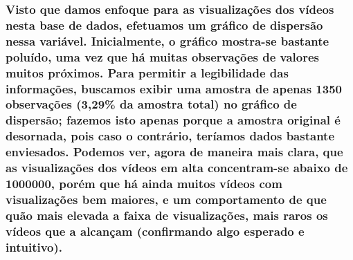 \documentclass[]{article}
\begin{document}
\hypertarget{visto-que-damos-enfoque-para-as-visualizacoes-dos-videos-nesta-base-de-dados-efetuamos-um-grafico-de-dispersao-nessa-variavel.-inicialmente-o-grafico-mostra-se-bastante-poluido-uma-vez-que-ha-muitas-observacoes-de-valores-muitos-proximos.-para-permitir-a-legibilidade-das-informacoes-buscamos-exibir-uma-amostra-de-apenas-1350-observacoes-329-da-amostra-total-no-grafico-de-dispersao-fazemos-isto-apenas-porque-a-amostra-original-e-desornada-pois-caso-o-contrario-teriamos-dados-bastante-enviesados.-podemos-ver-agora-de-maneira-mais-clara-que-as-visualizacoes-dos-videos-em-alta-concentram-se-abaixo-de-1000000-porem-que-ha-ainda-muitos-videos-com-visualizacoes-bem-maiores-e-um-comportamento-de-que-quao-mais-elevada-a-faixa-de-visualizacoes-mais-raros-os-videos-que-a-alcancam-confirmando-algo-esperado-e-intuitivo.}{%
\subsubsection{Visto que damos enfoque para as visualizações dos vídeos
nesta base de dados, efetuamos um gráfico de dispersão nessa variável.
Inicialmente, o gráfico mostra-se bastante poluído, uma vez que há
muitas observações de valores muitos próximos. Para permitir a
legibilidade das informações, buscamos exibir uma amostra de apenas 1350
observações (3,29\% da amostra total) no gráfico de dispersão; fazemos
isto apenas porque a amostra original é desornada, pois caso o
contrário, teríamos dados bastante enviesados. Podemos ver, agora de
maneira mais clara, que as visualizações dos vídeos em alta
concentram-se abaixo de 1000000, porém que há ainda muitos vídeos com
visualizações bem maiores, e um comportamento de que quão mais elevada a
faixa de visualizações, mais raros os vídeos que a alcançam (confirmando
algo esperado e
intuitivo).}\label{visto-que-damos-enfoque-para-as-visualizacoes-dos-videos-nesta-base-de-dados-efetuamos-um-grafico-de-dispersao-nessa-variavel.-inicialmente-o-grafico-mostra-se-bastante-poluido-uma-vez-que-ha-muitas-observacoes-de-valores-muitos-proximos.-para-permitir-a-legibilidade-das-informacoes-buscamos-exibir-uma-amostra-de-apenas-1350-observacoes-329-da-amostra-total-no-grafico-de-dispersao-fazemos-isto-apenas-porque-a-amostra-original-e-desornada-pois-caso-o-contrario-teriamos-dados-bastante-enviesados.-podemos-ver-agora-de-maneira-mais-clara-que-as-visualizacoes-dos-videos-em-alta-concentram-se-abaixo-de-1000000-porem-que-ha-ainda-muitos-videos-com-visualizacoes-bem-maiores-e-um-comportamento-de-que-quao-mais-elevada-a-faixa-de-visualizacoes-mais-raros-os-videos-que-a-alcancam-confirmando-algo-esperado-e-intuitivo.}}
\end{document}
